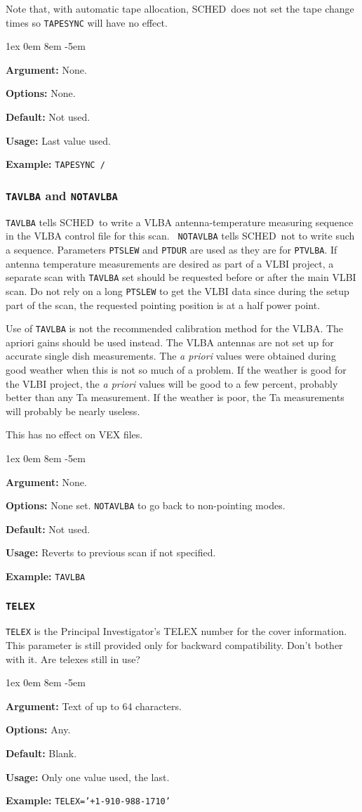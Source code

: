 \documentclass{report}
\newcommand{\schedb}{{\sc SCHED~}}
\newcommand{\rcwbox}[5]{
  \begin{list}{}{\parsep 1ex  \itemsep 0em
                 \leftmargin 8em  \itemindent -5em }
    \item {\bf Argument:} #1
    \item {\bf Options:}  #2
    \item {\bf Default:}  #3
    \item {\bf Usage:}    #4
    \item {\bf Example:}  #5
  \end{list}
}
\begin{document}
Note that, with automatic tape allocation, \schedb does not set the
tape change times so {\tt TAPESYNC} will have no effect.

\rcwbox
{None.}
{None.}
{Not used.}
{Last value used.}
{{\tt TAPESYNC /}}

\subsubsection{\label{MP:TAVLBA}{\tt TAVLBA} and {\tt NOTAVLBA}}

{\tt TAVLBA} tells \schedb to write a VLBA antenna-temperature
measuring sequence in the VLBA control file for this scan.  {\tt
NOTAVLBA} tells \schedb not to write such a sequence.  Parameters
{\tt PTSLEW} and {\tt PTDUR} are used as they are for {\tt PTVLBA}.
If antenna temperature measurements are desired as part of a VLBI
project, a separate scan with {\tt TAVLBA} set should be requested
before or after the main VLBI scan. Do not rely on a long {\tt PTSLEW}
to get the VLBI data since during the setup part of the scan, the
requested pointing position is at a half power point.

Use of {\tt TAVLBA} is not the recommended calibration method for the
VLBA. The apriori gains should be used instead. The VLBA antennas are
not set up for accurate single dish measurements. The {\em a priori}
values were obtained during good weather when this is not so much of a
problem. If the weather is good for the VLBI project, the {\em a
priori} values will be good to a few percent, probably better than any
Ta measurement. If the weather is poor, the Ta measurements will
probably be nearly useless.

This has no effect on VEX files.

\rcwbox
{None.}
{None set. {\tt NOTAVLBA} to go back to non-pointing modes.}
{Not used.}
{Reverts to previous scan if not specified.}
{{\tt TAVLBA}}


\subsubsection{\label{MP:TELEX}{\tt TELEX}}

{\tt TELEX} is the Principal Investigator's TELEX number for the
cover information.  This parameter is still provided only for
backward compatibility.  Don't bother with it.  Are telexes still
in use?

\rcwbox
{Text of up to 64 characters.}
{Any.}
{Blank.}
{Only one value used, the last.}
{{\tt TELEX='+1-910-988-1710'}}
\end{document}
